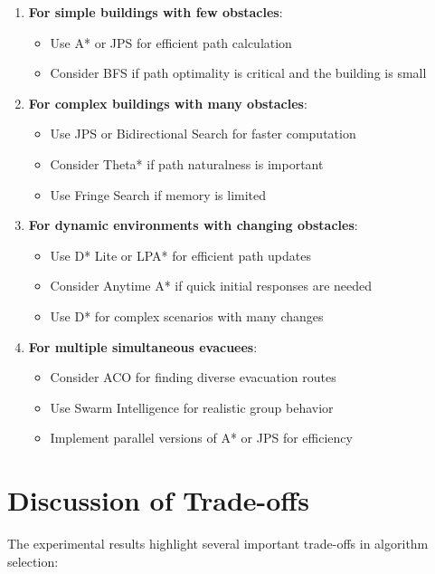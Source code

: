 \documentclass[11pt,a4paper]{report}
\begin{document}
\begin{enumerate}
    \item \textbf{For simple buildings with few obstacles}:
    \begin{itemize}
        \item Use A* or JPS for efficient path calculation
        \item Consider BFS if path optimality is critical and the building is small
    \end{itemize}
    
    \item \textbf{For complex buildings with many obstacles}:
    \begin{itemize}
        \item Use JPS or Bidirectional Search for faster computation
        \item Consider Theta* if path naturalness is important
        \item Use Fringe Search if memory is limited
    \end{itemize}
    
    \item \textbf{For dynamic environments with changing obstacles}:
    \begin{itemize}
        \item Use D* Lite or LPA* for efficient path updates
        \item Consider Anytime A* if quick initial responses are needed
        \item Use D* for complex scenarios with many changes
    \end{itemize}
    
    \item \textbf{For multiple simultaneous evacuees}:
    \begin{itemize}
        \item Consider ACO for finding diverse evacuation routes
        \item Use Swarm Intelligence for realistic group behavior
        \item Implement parallel versions of A* or JPS for efficiency
    \end{itemize}
\end{enumerate}

\section{Discussion of Trade-offs}
The experimental results highlight several important trade-offs in algorithm selection:
\end{document}
